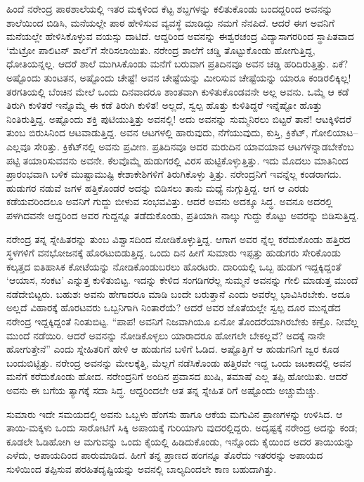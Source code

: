 ಹಿಂದೆ ನರೇಂದ್ರ ಪಾಠಶಾಲೆಯಲ್ಲಿ ಇತರ ಮಕ್ಕಳಿಂದ ಕೆಟ್ಟ ಶಬ್ದಗಳನ್ನು ಕಲಿತುಕೊಂಡು ಬಂದದ್ದರಿಂದ ಅವನನ್ನು ಶಾಲೆಯಿಂದ ಬಿಡಿಸಿ, ಮನೆಯಲ್ಲೇ ಪಾಠ ಹೇಳಿಸುವ ವ್ಯವಸ್ಥೆ ಮಾಡಿದ್ದು ನಮಗೆ ನೆನಪಿದೆ. ಆದರೆ ಈಗ ಅವನಿಗೆ ಮನೆಯಲ್ಲೇ ಹೇಳಿಸಿಕೊಳ್ಳುವ ವಯಸ್ಸು ದಾಟಿದೆ. ಆದ್ದರಿಂದ ಅವನನ್ನು ಈಶ್ವರಚಂದ್ರ ವಿದ್ಯಾಸಾಗರರಿಂದ ಸ್ಥಾಪಿತವಾದ ‘ಮೆಟ್ರೋ ಪಾಲಿಟನ್ ಶಾಲೆ’ಗೆ ಸೇರಿಸಲಾಯಿತು. ನರೇಂದ್ರ ಶಾಲೆಗೆ ಚಡ್ಡಿ ತೊಟ್ಟುಕೊಂಡು ಹೋಗುತ್ತಿದ್ದ, ಧೋತಿಯನ್ನಲ್ಲ. ಆದರೆ ಶಾಲೆ ಮುಗಿಸಿಕೊಂಡು ಮನೆಗೆ ಬರುವಾಗ ಪ್ರತಿದಿನವೂ ಅವನ ಚಡ್ಡಿ ಹರಿದಿರುತ್ತಿತ್ತು. ಏಕೆ? ಅಷ್ಟೊಂದು ತುಂಟತನ, ಅಷ್ಟೊಂದು ಚೇಷ್ಟೆ! ಅವನ ಚೇಷ್ಟೆಯನ್ನು ಮೀರಿಸುವ ಚೇಷ್ಟೆಯನ್ನು ಯಾರೂ ಕಂಡಿರಲಿಕ್ಕಿಲ್ಲ! ತರಗತಿಯಲ್ಲಿ ಬೆಂಚಿನ ಮೇಲೆ ಒಂದು ದಿನವಾದರೂ ಶಾಂತವಾಗಿ ಕುಳಿತುಕೊಂಡವನೇ ಅಲ್ಲ ಅವನು. ಒಮ್ಮೆ ಆ ಕಡೆ ತಿರುಗಿ ಕುಳಿತರೆ ಇನ್ನೊಮ್ಮೆ ಈ ಕಡೆ ತಿರುಗಿ ಕುಳಿತ! ಅಲ್ಲದೆ, ಸ್ವಲ್ಪ ಹೊತ್ತು ಕುಳಿತಿದ್ದರೆ ಇನ್ನೆಷ್ಟೋ ಹೊತ್ತು ನಿಂತಿರುತ್ತಿದ್ದ. ಅಷ್ಟೊಂದು ಶಕ್ತಿ ಪುಟಿಯುತ್ತಿತ್ತು ಅವನಲ್ಲಿ! ಅದು ಅವನನ್ನು ಸುಮ್ಮನಿರಲು ಬಿಟ್ಟರೆ ತಾನೆ! ಆಟಕ್ಕಿಳಿದರೆ ತುಂಬ ಬಿರುಸಿನಿಂದ ಆಟವಾಡುತ್ತಿದ್ದ. ಅವನ ಆಟಗಳಲ್ಲಿ ಹಾರುವುದು, ನೆಗೆಯುವುದು, ಕುಸ್ತಿ, ಕ್ರಿಕೆಟ್, ಗೋಲಿಯಾಟ–ಎಲ್ಲವೂ ಸೇರಿತ್ತು. ಕ್ರಿಕೆಟ್​ನಲ್ಲಿ ಅವನು ಪ್ರವೀಣ. ಪ್ರತಿದಿನವೂ ಅದರ ಮರುದಿನ ಯಾವಯಾವ ಆಟಗಳನ್ನಾಡಬೇಕೆಂಬ ಪಟ್ಟಿ ತಯಾರಿಸುವವನು ಅವನೇ. ಕೆಲವೊಮ್ಮೆ ಹುಡುಗರಲ್ಲಿ ವಿರಸ ಹುಟ್ಟಿಕೊಳ್ಳುತ್ತಿತ್ತು. ಇದು ಮೊದಲು ಮಾತಿನಿಂದ ಪ್ರಾರಂಭವಾಗಿ ಬಳಿಕ ಮುಷ್ಟಾಮುಷ್ಟಿ ಕೇಶಾಕೇಶಿಗಳಿಗೆ ತಿರುಗಿಕೊಳ್ಳು ತ್ತಿತ್ತು. ನರೇಂದ್ರನಿಗೆ ಇವನ್ನೆಲ್ಲ ಕಂಡರಾಗದು. ಹುಡುಗರ ನಡುವೆ ಜಗಳ ಹತ್ತಿಕೊಂಡರೆ ಅದನ್ನು ಬಿಡಿಸಲು ತಾನು ಮಧ್ಯೆ ನುಗ್ಗುತ್ತಿದ್ದ. ಆಗ ಆ ಎರಡು ಕಡೆಯವರಿಂದಲೂ ಅವನಿಗೆ ಗುದ್ದು ಬೀಳುವ ಸಂಭವವಿತ್ತು. ಆದರೆ ಅವನು ಅದಕ್ಕೂ ಸಿದ್ಧ. ಅವನೂ ಅದರಲ್ಲಿ ಪಳಗಿದವನೇ ಆದ್ದರಿಂದ ಅವರ ಗುದ್ದನ್ನೂ ತಡೆದುಕೊಂಡು, ಪ್ರತಿಯಾಗಿ ನಾಲ್ಕು ಗುದ್ದು ಕೊಟ್ಟು ಅವರನ್ನು ಬಿಡಿಸುತ್ತಿದ್ದ.

ನರೇಂದ್ರ ತನ್ನ ಸ್ನೇಹಿತರನ್ನು ತುಂಬ ವಿಶ್ವಾಸದಿಂದ ನೋಡಿಕೊಳ್ಳುತ್ತಿದ್ದ. ಆಗಾಗ ಅವರ ನ್ನೆಲ್ಲ ಕರೆದುಕೊಂಡು ಹತ್ತಿರದ ಸ್ಥಳಗಳಿಗೆ ವನಭೋಜನಕ್ಕೆ ಹೊರಟುಬಿಡುತ್ತಿದ್ದ. ಒಂದು ದಿನ ಹೀಗೆ ಸುಮಾರು ಇಪ್ಪತ್ತು ಹುಡುಗರು ಸೇರಿಕೊಂಡು ಕಲ್ಕತ್ತದ ಐತಿಹಾಸಿಕ ಕೋಟೆಯನ್ನು ನೋಡಿಕೊಂಡುಬರಲು ಹೊರಟರು. ದಾರಿಯಲ್ಲಿ ಒಬ್ಬ ಹುಡುಗ ಇದ್ದಕ್ಕಿದ್ದಂತೆ ‘ಆಯಾಸ, ಸಂಕಟ’ ಎನ್ನುತ್ತ ಕುಳಿತುಬಿಟ್ಟ. ಇದನ್ನು ಕೇಳಿದ ಸಂಗಡಿಗರೆಲ್ಲ ಸುಮ್ಮನೆ ಅವನನ್ನು ಗೇಲಿ ಮಾಡುತ್ತ ಮುಂದೆ ನಡೆದೇಬಿಟ್ಟರು. ಬಹುಶಃ ಅವನು ಹೇಗಾದರೂ ಮಾಡಿ ಬಂದೇ ಬರುತ್ತಾನೆ ಎಂದು ಅವರೆಲ್ಲ ಭಾವಿಸಿರಬೇಕು. ಅದೂ ಅಲ್ಲದೆ ವಿಹಾರಕ್ಕೆ ಹೊರಟವರು ಒಬ್ಬನಿಗಾಗಿ ನಿಂತಾರೆಯೆ? ಆದರೆ ಅವರ ಜೊತೆಯಲ್ಲೇ ಸ್ವಲ್ಪ ದೂರ ಮುನ್ನಡೆದ ನರೇಂದ್ರ ಇದ್ದಕ್ಕಿದ್ದಂತೆ ನಿಂತುಬಿಟ್ಟ. “ಪಾಪ! ಅವನಿಗೆ ನಿಜವಾಗಿಯೂ ಏನೋ ತೊಂದರೆಯಾಗಿರಬೇಕು ಕಣ್ರೊ. ನೀವೆಲ್ಲ ಮುಂದೆ ನಡೆಯಿರಿ. ಆದರೆ ಅವನನ್ನು ನೋಡಿಕೊಳ್ಳಲು ಯಾರಾದರೂ ಹೋಗಲೇ ಬೇಕಲ್ಲವೆ? ಅದಕ್ಕೆ ನಾನೇ ಹೋಗುತ್ತೇನೆ” ಎಂದು ಸ್ನೇಹಿತರಿಗೆ ಹೇಳಿ ಆ ಹುಡುಗನ ಬಳಿಗೆ ಓಡಿದ. ಅಷ್ಟೊತ್ತಿಗೆ ಆ ಹುಡುಗನಿಗೆ ಜ್ವರ ಕೂಡ ಬಂದುಬಿಟ್ಟಿತ್ತು. ನರೇಂದ್ರ ಅವನನ್ನು ಮೇಲಕ್ಕೆತ್ತಿ, ಮೆಲ್ಲಗೆ ನಡೆಸಿಕೊಂಡು ಹತ್ತಿರವೇ ಇದ್ದ ಒಂದು ಜಟಕಾದಲ್ಲಿ ಅವನ ಮನೆಗೆ ಕರೆದುಕೊಂಡು ಹೋದ. ನರೇಂದ್ರನಿಗೆ ಅಂದಿನ ಪ್ರವಾಸದ ಖುಷಿ, ತಮಾಷೆ ಎಲ್ಲ ತಪ್ಪಿ ಹೋಯಿತು. ಆದರೆ ಅವನು ಈ ಬಗೆಯ ತ್ಯಾಗಕ್ಕೆ ಸದಾ ಸಿದ್ಧ. ಆದ್ದರಿಂದಲೇ ಆತ ತನ್ನ ಸ್ನೇಹಿತ ರಿಗೆ ಅಷ್ಟೊಂದು ಅಚ್ಚುಮೆಚ್ಚು.

ಸುಮಾರು ಇದೇ ಸಮಯದಲ್ಲಿ ಅವನು ಒಬ್ಬಳು ಹೆಂಗಸು ಹಾಗೂ ಆಕೆಯ ಮಗುವಿನ ಪ್ರಾಣಗಳನ್ನು ಉಳಿಸಿದ. ಆ ತಾಯಿ-ಮಕ್ಕಳು ಒಂದು ಸಾರೋಟಿಗೆ ಸಿಕ್ಕಿ ಅಪಾಯಕ್ಕೆ ಗುರಿಯಾಗು ವುದರಲ್ಲಿದ್ದರು. ಅದೃಷ್ಟಕ್ಕೆ ನರೇಂದ್ರ ಅದನ್ನು ಕಂಡ; ಕೂಡಲೇ ಓಡಿಹೋಗಿ ಆ ಮಗುವನ್ನು ಒಂದು ಕೈಯಲ್ಲಿ ಹಿಡಿದುಕೊಂಡು, ಇನ್ನೊಂದು ಕೈಯಿಂದ ಅದರ ತಾಯಿಯನ್ನು ಎಳೆದು, ಅಪಾಯದಿಂದ ಪಾರುಮಾಡಿದ. ಹೀಗೆ ತನ್ನ ಪ್ರಾಣದ ಹಂಗನ್ನೂ ತೊರೆದು ಇತರರನ್ನು ಅಪಾಯದ ಸುಳಿಯಿಂದ ತಪ್ಪಿಸುವ ಪರಹಿತದೃಷ್ಟಿಯನ್ನು ಅವನಲ್ಲಿ ಬಾಲ್ಯದಿಂದಲೇ ಕಾಣ ಬಹುದಾಗಿತ್ತು.

